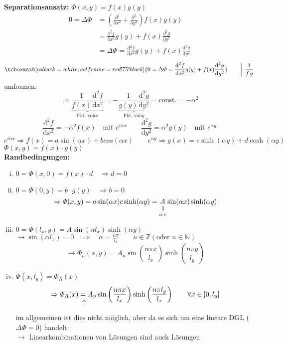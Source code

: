 \documentclass[titlepage,11pt,a4paper,ngerman]{report}
\newcommand{\tx}[1]{\textrm{#1}}
\newcommand{\const}{\tx{const.}}
\newcommand{\ub}[1]{\underbrace{#1}}
\newcommand{\verteq}{\rotatebox{90}{$\,=$}}
\newcommand{\equalto}[2]{\underset{\scriptstyle\overset{\mkern4mu\verteq}{#2}}{#1}}
\newcommand{\custo}[3]{\underset{\scriptstyle\overset{\mkern4mu\rotatebox{-90}{$\,#1$}}{#3}}{#2}}
\newcommand{\prt}[2]{\frac{\partial #1}{\partial #2}}
\newcommand{\prd}[2]{\frac{\tx{d} #1}{\tx{d} #2}}
\renewcommand{\Phi}{\varPhi}
\newcommand{\rmbox}[1]{\tcboxmath[colback=white,colframe=red!75!black]{#1}}
\begin{document}
\textbf{Separationsansatz:}
$ \Phi(x,y) = f(x) g(y) $
\begin{align*}
0 = \Delta \Phi &= \left(\prt{^2}{x^2} + \prt{^2}{y^2}\right) f(x) g(y)\\
&= \prt{^2 f}{x^2} g(y) + f(x) \prt{^2 g}{y^2}\\
&= \Delta \Phi = \prd{^2 f}{x^2} g(y) + f(x) \prd{^2 g}{y^2}
\end{align*}
\begin{equation*}
\rmbox{0 = \Delta \Phi = \prd{^2 f}{x^2} g(y) + f(x) \prd{^2 g}{y^2} } \qquad \left\rvert \cdot \, \frac{1}{f\,g} \right.
\end{equation*}
umformen:
\begin{equation*}
\Rightarrow \ub{\frac{1}{f(x)} \prd{^2 f}{x^2}}_{\tx{Fkt. von} x} = - \ub{\frac{1}{g(y)} \prd{^2 g}{y^2}}_{\tx{Fkt. von} y} = \const = - \alpha ^2
\end{equation*}
\begin{equation*}
\prd{^2 f}{x^2} = - \alpha^2 f(x) \quad \tx{mit } e^{i\alpha x} \qquad \prd{^2 g}{y^2} = \alpha^2 g(y) \quad \tx{mit } e^{\alpha y}
\end{equation*}
\begin{equation*}
e^{i \alpha x} \Rightarrow f(x) = a \sin(\alpha x) + b cos(\alpha x) \qquad e^{\alpha y} \Rightarrow g(x) = c \sinh(\alpha y) + d \cosh(\alpha y)
\end{equation*}
$ \Phi(x,y) = f(x) \cdot g(y) $\\[5pt]
\textbf{Randbedingungen:}
\begin{enumerate}[i)]
	\item $ 0 = \Phi(x,0) = f(x) \cdot d \quad \Rightarrow d = 0 $
	\item $ 0 = \Phi(0,y) = b \cdot g(y) \quad \Rightarrow b = 0 $
	\begin{equation*}
	\Rightarrow \Phi(x,y) = a \sin(\alpha x) c \sinh(\alpha y) = \equalto{A}{a\cdot c} \sin(\alpha x) \sinh(\alpha y)
	\end{equation*}
	\item $ 0 = \Phi(l_x,y) = A \sin(\alpha l_x) \sinh(\alpha y) $
	$ \rightarrow \sin(\alpha l_x) = 0 \quad \Rightarrow \quad \alpha = \frac{n \pi}{l_x} \qquad n \in \mathbb{Z} (\tx{oder } n \in \mathbb{N}) $
	\begin{equation*}
	\rightarrow \Phi_n(x,y) = A_n \sin\left(\frac{n \pi x}{l_x}\right) \sinh\left(\frac{n \pi y}{l_y}\right)
	\end{equation*}
	\item $ \Phi(x,l_y) = \Phi_R(x) $
	\begin{equation*}
	\Rightarrow \Phi_R(x) \custo{\leftarrow}{=}{} A_n \sin\left(\frac{n \pi x}{l_x}\right) \sinh\left(\frac{n \pi l_y}{l_x}\right) \qquad \forall x \in [0,l_y]
	\end{equation*}
	im allgemeinen ist dies nicht möglich, aber da es sich um eine lineare DGL ($ \Delta \Phi = 0 $) handelt:\\
	$ \rightarrow $ Linearkombinationen von Lösungen sind auch Lösungen
\end{enumerate}
\end{document}
